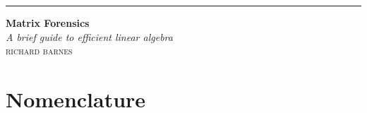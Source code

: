 \documentclass{book}
\begin{document}
\begin{titlepage} %
  \raggedleft %
  
  \rule{1pt}{\textheight} %
  \hspace{0.05\textwidth} %
  \parbox[b]{0.75\textwidth}{ %
    
    {\Huge\bfseries Matrix Forensics \\[\baselineskip]} %
    {\large\textit{A brief guide to efficient linear algebra}}\\[4\baselineskip] %
    {\Large\textsc{richard barnes}} %
    
    \vspace{0.6\textheight} %
    
  }

\end{titlepage}


\tableofcontents

\chapter{Nomenclature}
\end{document}
